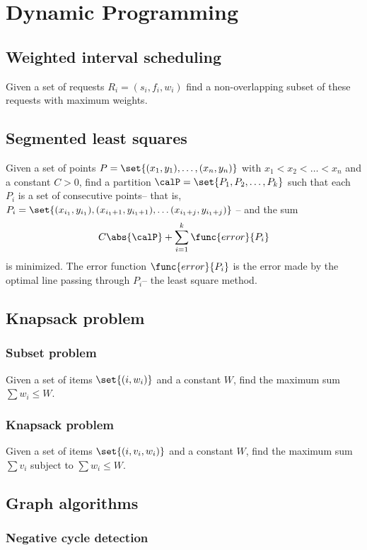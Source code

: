 \chapter{Dynamic Programming}
\section*{Weighted interval scheduling}
Given a set of requests \(R_i = (s_i,f_i,w_i)\) find a non-overlapping subset of these requests with maximum weights.

\section*{Segmented least squares}
Given a set of points \(P = \set{(x_1,y_1), \dots, (x_n,y_n)}\) with \(x_1 < x_2 < \dots < x_n\) and a constant \(C > 0\), find a partition \(\calP = \set{P_1, P_2, \dots, P_k}\) such that each \(P_i\) is a set of consecutive points-- that is, \(P_i = \set{(x_{i_1}, y_{i_1}), (x_{i_1 + 1}, y_{i_1 + 1}) , \dots (x_{i_1 + j}, y_{i_1+j})}\) -- and the sum 
\begin{equation*}
    C \abs{\calP} + \sum_{i =1}^k \func{error}{P_i}
\end{equation*}
is minimized. The error function \(\func{error}{P_i}\) is the error made by the optimal line passing through \(P_i\)-- the least square method.
\section*{Knapsack problem}
\subsection*{Subset problem}
Given a set of items \(\set{(i,w_i)}\) and a constant \(W\), find the maximum sum \(\sum w_i \leq W\).
\subsection*{Knapsack problem}
Given a set of items \(\set{(i,v_i, w_i)}\) and a constant \(W\), find the maximum sum \(\sum v_i\) subject to \(\sum w_i \leq W\).
\section*{Graph algorithms}
\subsection*{Negative cycle detection}
